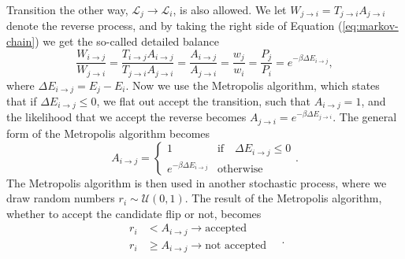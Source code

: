 \documentclass[]{article}
\begin{document}
Transition the other way, $\mathcal{L}_j \rightarrow \mathcal{L}_i$, is also allowed. We let $W_{j \rightarrow i} = T_{j \rightarrow i} A_{j \rightarrow i}$ denote the reverse process, and by taking the right side of Equation (\ref{eq:markov-chain}) we get the so-called detailed balance 
\begin{equation}
	\frac{W_{i \rightarrow j}}{W_{j \rightarrow i}} 
	= \frac{T_{i \rightarrow j} A_{i \rightarrow j}}{T_{j \rightarrow i} A_{j \rightarrow i}} 
	= \frac{A_{i \rightarrow j}}{A_{j \rightarrow i}}
	= \frac{w_j}{w_i} = \frac{P_j}{P_i} = e^{-\beta \Delta E_{i \rightarrow j}},
\end{equation}
where $\Delta E_{i \rightarrow j} = E_j - E_i$. Now we use the Metropolis algorithm, which states that if $\Delta E_{i \rightarrow j} \le 0$, we flat out accept the transition, such that $A_{i \rightarrow j} = 1$, and the likelihood that we accept the reverse becomes $A_{j \rightarrow i} = e^{-\beta \Delta E_{j \rightarrow i}}$. The general form of the Metropolis algorithm becomes
\begin{equation} \label{eq:metropolis}
	A_{i \rightarrow j} = 
	\begin{cases}
	1 &\text{if} \quad \Delta E_{i \rightarrow j} \le 0 \\
	e^{-\beta \Delta E_{i \rightarrow j}} &\text{otherwise}
	\end{cases}.
\end{equation}
The Metropolis algorithm is then used in another stochastic process, where we draw random numbers $r_i \sim \mathcal{U}(0,1)$. The result of the Metropolis algorithm, whether to accept the candidate flip or not, becomes
\begin{equation} \label{eq:metropolis-accept-or-not}
\begin{aligned}
	r_i &< A_{i \rightarrow j} \rightarrow \text{accepted} \\
	r_i &\ge A_{i \rightarrow j} \rightarrow \text{not accepted} \\
\end{aligned} \quad.
\end{equation}

\vspace{5mm}
\end{document}
